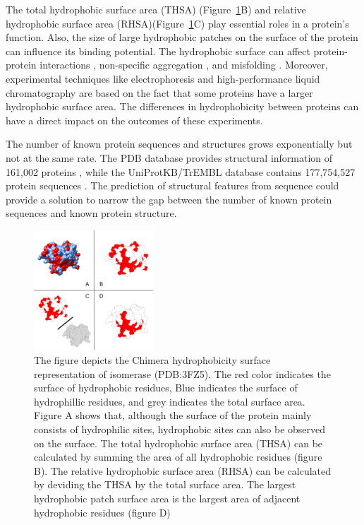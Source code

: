 \documentclass[11pt,a4paper]{article}
\begin{document}
The total hydrophobic surface area (THSA) (Figure~\ref{hydrophhydrophil}B) and relative hydrophobic surface area (RHSA)(Figure~\ref{hydrophhydrophil}C) play essential roles in a protein's function. Also, the size of large hydrophobic patches on the surface of the protein can influence its binding potential. The hydrophobic surface can affect protein-protein interactions \cite{larsen1998morphology}, non-specific aggregation \cite{beyreuther1991mechanisms}, and misfolding \cite{dobson2004principles}. Moreover, experimental techniques like electrophoresis \cite{wilkins1998two} and high-performance liquid chromatography \cite{kaliszan1990high} are based on the fact that some proteins have a larger hydrophobic surface area. The differences in hydrophobicity between proteins can have a direct impact on the outcomes of these experiments.

The number of known protein sequences and structures grows exponentially but not at the same rate. The PDB database provides structural information of 161,002 proteins \cite{berman2002protein}, while the UniProtKB/TrEMBL database contains 177,754,527 protein sequences \cite{uniprot2019uniprot}. The prediction of structural features from sequence could provide a solution to narrow the gap between the number of known protein sequences and known protein structure.

\begin{figure}[h!]
  \centering
  \includegraphics[width=0.4\textwidth]{figures/THSA_RHSA_LHPSA.png}
  \caption{The figure depicts the Chimera hydrophobicity surface representation of isomerase (PDB:3FZ5). The red color indicates the surface of hydrophobic residues, Blue indicates the surface of hydrophillic residues, and grey indicates the total surface area. Figure A shows that, although the surface of the protein mainly consists of hydrophilic sites, hydrophobic sites can also be observed on the surface. The total hydrophobic surface area (THSA) can be calculated by summing the area of all hydrophobic residues (figure B). The relative hydrophobic surface area (RHSA) can be calculated by deviding the THSA by the total surface area. The largest hydrophobic patch surface area is the largest area of adjacent hydrophobic residues (figure D)}
  \label{hydrophhydrophil}
\end{figure}
\end{document}
